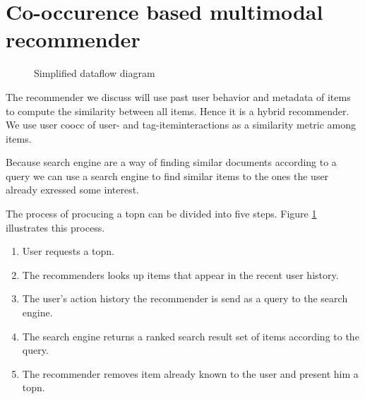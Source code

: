 \section{Co-occurence based multimodal recommender}
\label{sec:design}

\begin{figure}
  \centering
  \caption{Simplified dataflow diagram}
  \label{fig:topndataflow}
\end{figure}

The recommender we discuss will use past user behavior and metadata of items to compute the similarity between all items. Hence it is a hybrid recommender.
We use user \gls{coocc} of user- and tag-iteminteractions as a similarity metric among items.

Because search engine are a way of finding similar documents according to a query we can use a search engine to find similar items to the ones the user already exressed some interest.

The process of procucing a \gls{topn} can be divided into five steps. Figure \ref{fig:topndataflow} illustrates this process.

\begin{enumerate}
\item User requests a \gls{topn}.
\item The recommenders looks up items that appear in the recent user history.
\item The user's action history the recommender is send as a query to the search engine.
\item The search engine returns a ranked search result set of items according to the query.
\item The recommender removes item already known to the user and present him a \gls{topn}.
\end{enumerate}

